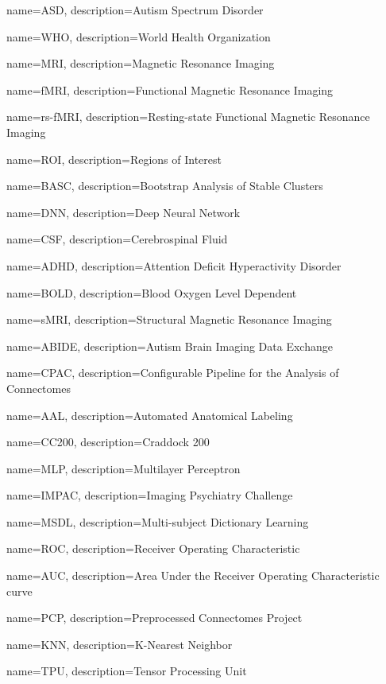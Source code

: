 \makeglossaries

{
    name=ASD,
    description={Autism Spectrum Disorder}
}

{
    name=WHO,
    description={World Health Organization}
}

{
    name=MRI,
    description={Magnetic Resonance Imaging}
}

{
    name=fMRI,
    description={Functional Magnetic Resonance Imaging}
}

{
    name=rs-fMRI,
    description={Resting-state Functional Magnetic Resonance Imaging}
}

{
    name=ROI,
    description={Regions of Interest}
}

{
    name=BASC,
    description={Bootstrap Analysis of Stable Clusters}
}

{
    name=DNN,
    description={Deep Neural Network}
}

{
    name=CSF,
    description={Cerebrospinal Fluid}
}

{
    name=ADHD,
    description={Attention Deficit Hyperactivity Disorder}
}

{
    name=BOLD,
    description={Blood Oxygen Level Dependent}
}

{
    name=sMRI,
    description={Structural Magnetic Resonance Imaging}
}

{
    name=ABIDE,
    description={Autism Brain Imaging Data Exchange}
}

{
    name=CPAC,
    description={Conﬁgurable Pipeline for the Analysis of Connectomes}
}

{
    name=AAL,
    description={Automated Anatomical Labeling}
}

{
    name=CC200,
    description={Craddock 200}
}

{
    name=MLP,
    description={Multilayer Perceptron}
}

{
    name=IMPAC,
    description={Imaging Psychiatry Challenge}
}

{
    name=MSDL,
    description={Multi-subject Dictionary Learning}
}

{
    name=ROC,
    description={Receiver Operating Characteristic}
}

{
    name=AUC,
    description={Area Under the Receiver Operating Characteristic curve}
}

{
    name=PCP,
    description={Preprocessed Connectomes Project}
}

{
    name=KNN,
    description={K-Nearest Neighbor}
}

{
    name=TPU,
    description={Tensor Processing Unit}
}

